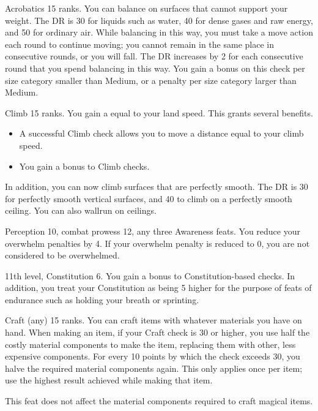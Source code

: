 \featpre Acrobatics 15 ranks.
\featben You can balance on surfaces that cannot support your weight.
The DR is 30 for liquids such as water, 40 for dense gases and raw energy, and 50 for ordinary air.
While balancing in this way, you must take a move action each round to continue moving; you cannot remain in the same place in consecutive rounds, or you will fall.
The DR increases by 2 for each consecutive round that you spend balancing in this way.
You gain a  bonus on this check per size category smaller than Medium, or a  penalty per size category larger than Medium.

\featpre Climb 15 ranks.
\featben You gain a  equal to your land speed.
This grants several benefits.
\begin{itemize}
    \item A successful Climb check allows you to move a distance equal to your climb speed.
    \item You gain a  bonus to Climb checks.
\end{itemize}

In addition, you can now climb surfaces that are perfectly smooth.
The DR is 30 for perfectly smooth vertical surfaces, and 40 to climb on a perfectly smooth ceiling.
You can also wallrun on ceilings.

\featpres Perception 10, combat prowess 12, any three Awareness feats.
\featben You reduce your overwhelm penalties by 4.
If your overwhelm penalty is reduced to 0, you are not considered to be overwhelmed.

\featpres 11th level, Constitution 6.
\featben You gain a  bonus to Constitution-based checks.
In addition, you treat your Constitution as being 5 higher for the purpose of feats of endurance such as holding your breath or sprinting.

\featpre Craft (any) 15 ranks.
\featben You can craft items with whatever materials you have on hand.
When making an item, if your Craft check is 30 or higher, you use half the costly material components to make the item, replacing them with other, less expensive components.
For every 10 points by which the check exceeds 30, you halve the required material components again.
This only applies once per item; use the highest result achieved while making that item.

This feat does not affect the material components required to craft magical items.


